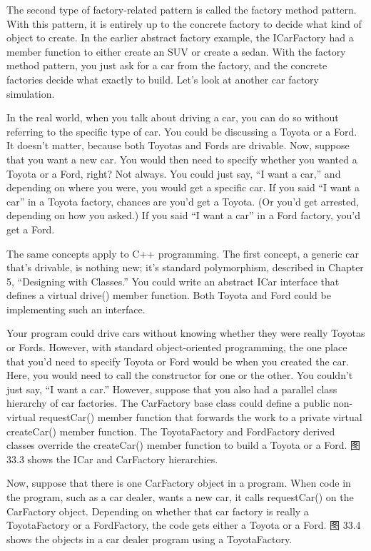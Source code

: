 
The second type of factory-related pattern is called the factory method pattern. With this pattern, it is entirely up to the concrete factory to decide what kind of object to create. In the earlier abstract factory example, the ICarFactory had a member function to either create an SUV or create a sedan. With the factory method pattern, you just ask for a car from the factory, and the concrete factories decide what exactly to build. Let’s look at another car factory simulation.


In the real world, when you talk about driving a car, you can do so without referring to the specific type of car. You could be discussing a Toyota or a Ford. It doesn’t matter, because both Toyotas and Fords are drivable. Now, suppose that you want a new car. You would then need to specify whether you wanted a Toyota or a Ford, right? Not always. You could just say, “I want a car,” and depending on where you were, you would get a specific car. If you said “I want a car” in a Toyota factory, chances are you’d get a Toyota. (Or you’d get arrested, depending on how you asked.) If you said “I want a car” in a Ford factory, you’d get a Ford.

The same concepts apply to C++ programming. The first concept, a generic car that’s drivable, is nothing new; it’s standard polymorphism, described in Chapter 5, “Designing with Classes.” You could write an abstract ICar interface that defines a virtual drive() member function. Both Toyota and Ford could be implementing such an interface.

Your program could drive cars without knowing whether they were really Toyotas or Fords. However, with standard object-oriented programming, the one place that you’d need to specify Toyota or Ford would be when you created the car. Here, you would need to call the constructor for one or the other. You couldn’t just say, “I want a car.” However, suppose that you also had a parallel class hierarchy of car factories. The CarFactory base class could define a public non-virtual requestCar() member function that forwards the work to a private virtual createCar() member function. The ToyotaFactory and FordFactory derived classes override the createCar() member function to build a Toyota or a Ford. 图 33.3 shows the ICar and CarFactory hierarchies.


Now, suppose that there is one CarFactory object in a program. When code in the program, such as a car dealer, wants a new car, it calls requestCar() on the CarFactory object. Depending on whether that car factory is really a ToyotaFactory or a FordFactory, the code gets either a Toyota or a Ford. 图 33.4 shows the objects in a car dealer program using a ToyotaFactory.


